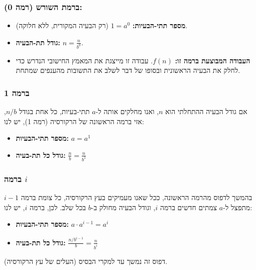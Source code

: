 \documentclass[11pt, a4paper]{article}
\begin{document}
\subsubsection*{ברמת השורש (רמה 0):}
\begin{itemize}
    \item \textbf{מספר תתי-הבעיות:} $1 = a^0$ (רק הבעיה המקורית, ללא חלוקה).
    \item \textbf{גודל תת-הבעיה:} $n = \frac{n}{b^0}$.
    \item \textbf{העבודה המבוצעת ברמה זו:} $f(n)$. עבודה זו מייצגת את המאמץ החישובי הנדרש כדי לחלק את הבעיה הראשונית ובסופו של דבר לשלב את התשובות מהענפים שמתחת.
\end{itemize}

\subsubsection*{ברמה 1}
אם גודל הבעיה ההתחלתי הוא $n$, ואנו מחלקים אותה ל-$a$ תתי-בעיות, כל אחת בגודל $n/b$, אזי ברמה הראשונה של הרקורסיה (רמה 1), יש לנו:
\begin{itemize}
    \item \textbf{מספר תתי-הבעיות:} $a = a^1$
    \item \textbf{גודל כל תת-בעיה:} $\frac{n}{b} = \frac{n}{b^1}$
\end{itemize}

\subsubsection*{ברמה $i$}
בהמשך לדפוס מהרמה הראשונה, ככל שאנו מעמיקים בעץ הרקורסיה, כל צומת ברמה $i-1$ מתפצל ל-$a$ צמתים חדשים ברמה $i$, וגודל הבעיה מחולק ב-$b$ בכל שלב. לכן, ברמה $i$, יש לנו:
\begin{itemize}
    \item \textbf{מספר תתי-הבעיות:} $a \cdot a^{i-1} = a^i$
    \item \textbf{גודל כל תת-בעיה:} $\frac{n/b^{i-1}}{b} = \frac{n}{b^i}$
\end{itemize}

דפוס זה נמשך עד למקרי הבסיס (העלים של עץ הרקורסיה).
\end{document}
